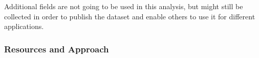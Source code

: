 Additional fields are not going to be used in this analysis, but might still be collected in order to
publish the dataset and enable others to use it for different applications.

%
%
%
%
%
%

\subsubsection{Resources and Approach}

